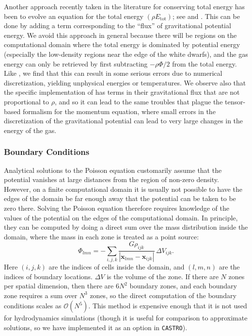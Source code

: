 \documentclass[iop]{../emulateapj}
\newcommand{\castro}{\texttt{CASTRO}}
\begin{document}
Another approach recently taken in the literature for conserving total energy has been to evolve an 
equation for the total energy $(\rho E_{\text{tot}})$; see \cite{marcello:2012} and \cite{jiang:2013}.
This can be done by adding a term corresponding to the ``flux'' of gravitational potential energy. We 
avoid this approach in general because there will be regions on the computational domain where the total 
energy is dominated by potential energy (especially the low-density regions near the edge of the white dwarfs),
and the gas energy can only be retrieved by first subtracting $-\rho \Phi/2$ from the total energy. Like 
\cite{arepo}, we find that this can result in some serious errors due to numerical discretization, yielding 
unphysical energies or temperatures. We observe also that the specific implementation of \cite{jiang:2013} 
has terms in their gravitational flux that are not proportional to $\rho$, and so it can lead to the 
same troubles that plague the tensor-based formalism for the momentum equation, where small errors 
in the discretization of the gravitational potential can lead to very large changes in the energy of the gas.

\subsubsection{Boundary Conditions}\label{sec:gravity_boundary_conditions}

Analytical solutions to the Poisson equation customarily assume that the
potential vanishes at large distances from the region of non-zero
density. However, on a finite computational domain it is usually not
possible to have the edges of the domain be far enough away that the
potential can be taken to be zero there. Solving the Poisson equation
therefore requires knowledge of the values of the potential on the
edges of the computational domain. In principle, they can be computed
by doing a direct sum over the mass distribution inside the domain,
where the mass in each zone is treated as a point source:
\begin{equation}
  \Phi_{{lmn}} = -\sum_{{i, j, k}} \frac{G \rho_{{ijk}}}{|\mathbf{x}_{{lmn}} - \mathbf{x}_{{ijk}}|}\, \Delta V_{{ijk}}.\label{eq:direct_sum}
\end{equation}
Here $(i, j, k)$ are the indices of cells inside the domain, and $(l,m, n)$ 
are the indices of boundary locations. $\Delta V$ is the volume of the
zone. If there are $N$ zones per spatial dimension, then there are
$6 N^2$ boundary zones, and each boundary zone requires a sum over
$N^3$ zones, so the direct computation of the boundary conditions
scales as $\mathcal{O}(N^5)$.  This method is expensive enough that it is not used
for hydrodynamics simulations (though it is useful for comparison to
approximate solutions, so we have implemented it as an option in \castro).
\end{document}
